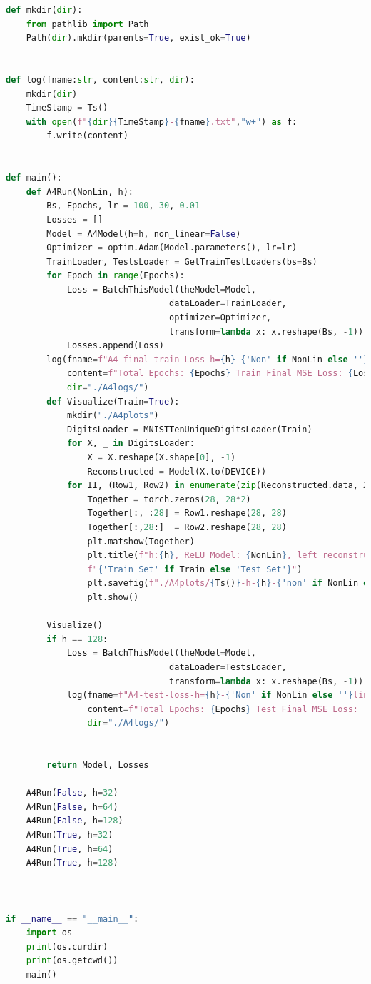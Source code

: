 \documentclass[]{article}
\begin{document}
\begin{lstlisting}[language=python]
def mkdir(dir):
    from pathlib import Path
    Path(dir).mkdir(parents=True, exist_ok=True)


def log(fname:str, content:str, dir):
    mkdir(dir)
    TimeStamp = Ts()
    with open(f"{dir}{TimeStamp}-{fname}.txt","w+") as f:
        f.write(content)


def main():
    def A4Run(NonLin, h):
        Bs, Epochs, lr = 100, 30, 0.01
        Losses = []
        Model = A4Model(h=h, non_linear=False)
        Optimizer = optim.Adam(Model.parameters(), lr=lr)
        TrainLoader, TestsLoader = GetTrainTestLoaders(bs=Bs)
        for Epoch in range(Epochs):
            Loss = BatchThisModel(theModel=Model,
                                dataLoader=TrainLoader,
                                optimizer=Optimizer,
                                transform=lambda x: x.reshape(Bs, -1))
            Losses.append(Loss)
        log(fname=f"A4-final-train-Loss-h={h}-{'Non' if NonLin else ''}lin-model",
            content=f"Total Epochs: {Epochs} Train Final MSE Loss: {Losses[-1]}",
            dir="./A4logs/")
        def Visualize(Train=True):
            mkdir("./A4plots")
            DigitsLoader = MNISTTenUniqueDigitsLoader(Train)
            for X, _ in DigitsLoader:
                X = X.reshape(X.shape[0], -1)
                Reconstructed = Model(X.to(DEVICE))
            for II, (Row1, Row2) in enumerate(zip(Reconstructed.data, X.data)):
                Together = torch.zeros(28, 28*2)
                Together[:, :28] = Row1.reshape(28, 28)
                Together[:,28:]  = Row2.reshape(28, 28)
                plt.matshow(Together)
                plt.title(f"h:{h}, ReLU Model: {NonLin}, left reconstructed, right Original\n"
                f"{'Train Set' if Train else 'Test Set'}")
                plt.savefig(f"./A4plots/{Ts()}-h-{h}-{'non' if NonLin else ''}lin-digit-{II}.png")
                plt.show()

        Visualize()
        if h == 128:
            Loss = BatchThisModel(theModel=Model,
                                dataLoader=TestsLoader,
                                transform=lambda x: x.reshape(Bs, -1))
            log(fname=f"A4-test-loss-h={h}-{'Non' if NonLin else ''}lin-model",
                content=f"Total Epochs: {Epochs} Test Final MSE Loss: {Loss}",
                dir="./A4logs/")


        return Model, Losses

    A4Run(False, h=32)
    A4Run(False, h=64)
    A4Run(False, h=128)
    A4Run(True, h=32)
    A4Run(True, h=64)
    A4Run(True, h=128)



if __name__ == "__main__":
    import os
    print(os.curdir)
    print(os.getcwd())
    main()
        \end{lstlisting}
    
\end{document}
